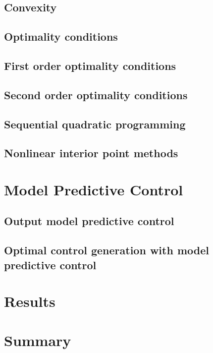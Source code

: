 \subsection{\color{red}Convexity}

\subsection{\color{red}Optimality conditions}

\subsection{\color{red}First order optimality conditions}

\subsection{\color{red}Second order optimality conditions}

\subsection{\color{red}Sequential quadratic programming}

\subsection{\color{red}Nonlinear interior point methods}


\section{\color{red}Model Predictive Control}

\subsection{\color{red}Output model predictive control}

\subsection{\color{red}Optimal control generation with model predictive control}


\section{\color{red}Results}


\section{\color{red}Summary}

